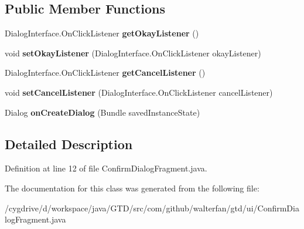 \subsection*{Public Member Functions}
\begin{DoxyCompactItemize}
\item 
\hypertarget{classcom_1_1github_1_1walterfan_1_1gtd_1_1ui_1_1ConfirmDialogFragment_a49ee392acba07a2ac605a60787aa5b89}{Dialog\-Interface.\-On\-Click\-Listener {\bfseries get\-Okay\-Listener} ()}\label{classcom_1_1github_1_1walterfan_1_1gtd_1_1ui_1_1ConfirmDialogFragment_a49ee392acba07a2ac605a60787aa5b89}

\item 
\hypertarget{classcom_1_1github_1_1walterfan_1_1gtd_1_1ui_1_1ConfirmDialogFragment_a41e71fc2203cc8ee0a2d1826f5e610d0}{void {\bfseries set\-Okay\-Listener} (Dialog\-Interface.\-On\-Click\-Listener okay\-Listener)}\label{classcom_1_1github_1_1walterfan_1_1gtd_1_1ui_1_1ConfirmDialogFragment_a41e71fc2203cc8ee0a2d1826f5e610d0}

\item 
\hypertarget{classcom_1_1github_1_1walterfan_1_1gtd_1_1ui_1_1ConfirmDialogFragment_ab74ad966b344b1f6dab9b77e6cbc807d}{Dialog\-Interface.\-On\-Click\-Listener {\bfseries get\-Cancel\-Listener} ()}\label{classcom_1_1github_1_1walterfan_1_1gtd_1_1ui_1_1ConfirmDialogFragment_ab74ad966b344b1f6dab9b77e6cbc807d}

\item 
\hypertarget{classcom_1_1github_1_1walterfan_1_1gtd_1_1ui_1_1ConfirmDialogFragment_a5607267202db07d68de5cc273ddcb9b8}{void {\bfseries set\-Cancel\-Listener} (Dialog\-Interface.\-On\-Click\-Listener cancel\-Listener)}\label{classcom_1_1github_1_1walterfan_1_1gtd_1_1ui_1_1ConfirmDialogFragment_a5607267202db07d68de5cc273ddcb9b8}

\item 
\hypertarget{classcom_1_1github_1_1walterfan_1_1gtd_1_1ui_1_1ConfirmDialogFragment_a3c0de676c53990e4e7f4a50ddbc4ffad}{Dialog {\bfseries on\-Create\-Dialog} (Bundle saved\-Instance\-State)}\label{classcom_1_1github_1_1walterfan_1_1gtd_1_1ui_1_1ConfirmDialogFragment_a3c0de676c53990e4e7f4a50ddbc4ffad}

\end{DoxyCompactItemize}


\subsection{Detailed Description}


Definition at line 12 of file Confirm\-Dialog\-Fragment.\-java.



The documentation for this class was generated from the following file\-:\begin{DoxyCompactItemize}
\item 
/cygdrive/d/workspace/java/\-G\-T\-D/src/com/github/walterfan/gtd/ui/Confirm\-Dialog\-Fragment.\-java\end{DoxyCompactItemize}
